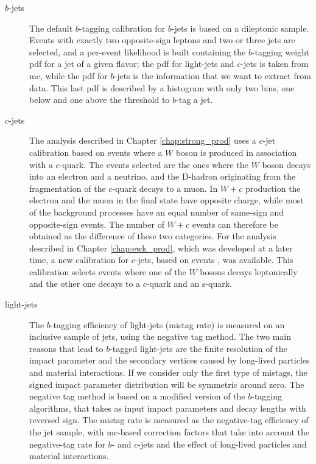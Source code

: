 \begin{description}

\item[$b$-jets] The default $b$-tagging calibration for $b$-jets is based on a \ttbar dileptonic sample. Events with exactly two opposite-sign leptons
and two or three jets are selected, and a per-event likelihood is built containing the $b$-tagging weight \gls{pdf} for a jet of a given flavor;
the \gls{pdf} for light-jets and $c$-jets is taken from \gls{mc}, while the \gls{pdf} for $b$-jets is the information that we want to extract from data.
This last \gls{pdf} is described by a histogram with only two bins, one below and one above the threshold to $b$-tag a jet. 


\item[$c$-jets] The analysis described in Chapter \ref{chap:strong_prod} uses a $c$-jet calibration based on events where a $W$ boson 
is produced in association with a $c$-quark. The events selected are the ones where the $W$ boson decays into an electron and a neutrino,
and the D-hadron originating from the fragmentation of the $c$-quark decays to a muon. 
In $W+c$ production the electron and the muon in the final state have opposite charge, 
while most of the background processes have an equal number of same-sign and opposite-sign events. The number of $W+c$ events can therefore 
be obtained as the difference of these two categories.
For the analysis described in Chapter \ref{chap:ewk_prod}, which was developed at a later time, a new calibration for $c$-jets, 
based on \ttbar events \cite{ATLAS:2018bpl}, was available. 
This calibration selects \ttbar events where one of the $W$ bosons decays leptonically and the other one decays to a $c$-quark and an s-quark. 

\item[light-jets] The $b$-tagging efficiency of light-jets (mistag rate) is measured on an inclusive sample of jets, using the negative tag method.
The two main reasons that lead to $b$-tagged light-jets are the finite resolution of the impact parameter and the secondary vertices caused
by long-lived particles and material interactions. If we consider only the first type of mistags, the signed impact parameter distribution 
will be symmetric around zero. 
The negative tag method is based on a modified version of the $b$-tagging algorithms, that takes as input impact parameters and decay lengths with
reversed sign. The mistag rate is measured as the negative-tag efficiency of the jet sample, with \gls{mc}-based correction factors that take into account 
the negative-tag rate for $b$- and $c$-jets and the effect of long-lived particles and material interactions.

\end{description}

